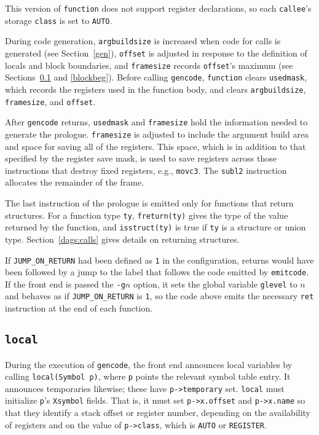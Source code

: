 This version of \verb|function| does not support register
declarations, so each \verb|callee|'s storage \verb|class| is
set to \verb|AUTO|.

During code generation, \verb|argbuildsize| is increased when
code for calls is generated (see Section~\ref{gen}), \verb|offset| is adjusted in response
to the definition of locals and block boundaries,
and \verb|framesize| records \verb|offset|'s maximum
(see Sections~\ref{local} and \ref{blockbeg}).
Before calling \verb|gencode|, \verb|function| clears
\verb|usedmask|, which records the registers used in the function body,
and clears \verb|argbuildsize|, \verb|framesize|, and \verb|offset|.

After \verb|gencode| returns, \verb|usedmask| and \verb|framesize|
hold the information needed to generate the prologue.
\verb|framesize| is adjusted to include the argument build area
and space for saving all of the registers.
This space, which is in addition to that specified by the register save mask,
is used to save registers across those instructions that
destroy fixed registers, e.g., \verb|movc3|.
The \verb|subl2| instruction allocates the remainder of the frame.

The last instruction of the prologue is emitted only for
functions that return structures. For a function type \verb|ty|,
\verb|freturn(ty)| gives the type of the value returned by the function,
and \verb|isstruct(ty)| is true if \verb|ty| is a structure or union type.
Section~\ref{dags:calls} gives details on returning structures.

If \verb|JUMP_ON_RETURN| had been defined as \verb|1| in the configuration,
returns would have been followed by a jump to the label
that follows the code emitted by \verb|emitcode|. If the front
end is passed the \verb|-g|$n$ option, it sets the global
variable \verb|glevel| to $n$
and behaves as if \verb|JUMP_ON_RETURN| is \verb|1|, so the code
above emits the necessary \verb|ret| instruction at the end
of each function.

\subsection{\tt local}

\label{local}

During the execution of \verb|gencode|, the front end announces local
variables by calling \verb|local(Symbol p)|, where \verb|p| points the
relevant symbol table entry.  It announces temporaries likewise; these
have \verb|p->temporary| set. \verb|local| must initialize \verb|p|'s
\verb|Xsymbol| fields. That is, it must set \verb|p->x.offset| and \verb|p->x.name|
so that they identify a
stack offset or register number, depending on the availability of
registers and on the value of \verb|p->class|, which is \verb|AUTO| or
\verb|REGISTER|.

